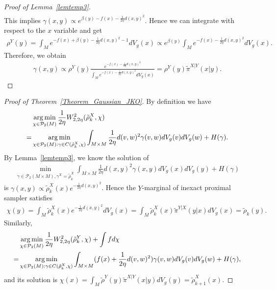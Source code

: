 \begin{proof}[Proof of Lemma~\ref{lemtemp3}]
\begin{align*}
    \end{align*}
    This implies $\gamma(x, y) \propto e^{\beta(y) - f(x) - \frac{1}{2\eta} d(x, y)^{2}}$. Hence we can integrate with respect to the $x$ variable and get 
    \begin{align*}
        \rho^{Y}(y) = \int_{M}e^{-f(x) + \beta(y) - \frac{1}{2\eta} d(x, y)^{2} - 1} dV_{g}(x) \propto e^{\beta(y)} \int_{M}e^{-f(x) - \frac{1}{2\eta} d(x, y)^{2}} dV_{g}(x).
    \end{align*}
    Therefore, we obtain
    \begin{align*}
        \gamma(x, y) 
        \propto \rho^{Y}(y) \frac{e^{- f(x) - \frac{1}{2\eta} d(x, y)^{2}}}{\int_{M}e^{-f(x) - \frac{1}{2\eta} d(x, y)^{2}} dV_{g}(x)} 
        = \rho^{Y}(y) \tilde{\pi}^{X|Y}(x|y).
    \end{align*}

\end{proof}


\begin{proof}[Proof of Theorem~\ref{Theorem_Gaussian_JKO}]
    By definition we have 
    \begin{align*}
            &\operatorname*{arg\,min}_{\chi \in \mathcal{P}_{2}(M)} \frac{1}{2\eta} W_{2, 2\eta}^{2}(\tilde{\rho}_{k}^{X}, \chi) \\
        =& \operatorname*{arg\,min}_{\chi \in \mathcal{P}_{2}(M): \gamma \in C(\tilde{\rho}_{k}^{X}, \chi)} 
        \int_{M \times M} \frac{1}{2\eta} d(v, w)^{2} \gamma(v, w) dV_{g}(v) dV_{g}(w) 
        +  H(\gamma). 
    \end{align*}
    By Lemma~\ref{lemtemp3}, we know the solution of 
    \begin{align*}
        \min_{
            \gamma \in \mathcal{P}_{2}(M \times M),
            \gamma^{X} = \tilde{\rho}_{k}^{X}
        } \int_{M \times M}\frac{1}{2\eta} d(x, y)^{2} \gamma (x, y) dV_{g}(x) dV_{g}(y) 
        + H(\gamma)
    \end{align*}
    is $\gamma(x, y) \propto \tilde{\rho}_{k}^{X}(x) e^{- \frac{1}{2\eta} d(x, y)^{2}}$.
    Hence the $Y$-marginal of inexact proximal sampler satisfies
    \begin{align*}
        \chi(y) = \int_{M} \tilde{\rho}_{k}^{X}(x) e^{- \frac{1}{2\eta}d(x, y)^{2}} dV_{g}(x)
        = \int_{M} \tilde{\rho}_{k}^{X}(x) \tilde{\pi}^{Y|X}(y|x) dV_{g}(x) 
        = \tilde{\rho}_{k}(y).
    \end{align*}
Similarly,
    \begin{align*}
            &\operatorname*{arg\,min}_{\chi \in \mathcal{P}_{2}(M)} 
            \frac{1}{2\eta} W_{2, 2\eta}^{2}(\tilde{\rho}_{k}^{Y}, \chi) + \int f d\chi \\
        =& \operatorname*{arg\,min}_{\chi \in \mathcal{P}_{2}(M): \gamma \in C(\tilde{\rho}_{k}^{X}, \chi)}
        \int_{M \times M} (f(x) + \frac{1}{2\eta} d(v, w)^{2}) \gamma(v, w) dV_{g}(v) dV_{g}(w) 
        +  H(\gamma), 
    \end{align*}
    and its solution is $\chi(x) = \int_{M} \tilde{\rho}^{Y}(y) \tilde{\pi}^{X|Y}(x|y) dV_{g}(y) = \tilde{\rho}_{k+1}^{X}(x)$.
\end{proof}


